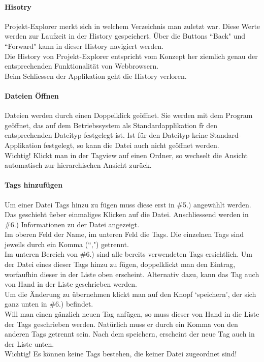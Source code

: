 \documentclass[10pt,paper=a4,final]{scrartcl}
\begin{document}
\paragraph{Hisotry}
Projekt-Explorer merkt sich in welchem Verzeichnis man zuletzt war. Diese Werte werden zur Laufzeit in der History gespeichert. \"Uber die Buttons “Back" und “Forward" kann in dieser History navigiert werden.\\
Die History von Projekt-Explorer entspricht vom Konzept her ziemlich genau der entsprechenden Funktionalit\"at von Webbrowsern.\\
Beim Schliessen der Applikation geht die History verloren.
\paragraph{Dateien \"Offnen}
Dateien werden durch einen Doppelklick ge\"offnet. Sie werden mit dem Program ge\"offnet, das auf dem Betriebssystem als Standardapplikation f\"r den entsprechenden Dateityp festgelegt ist. Ist f\"ur den Dateityp keine Standard-Applikation festgelegt, so kann die Datei auch nicht ge\"offnet werden.\\
Wichtig! Klickt man in der Tagview auf einen Ordner, so wechselt die Ansicht automatisch zur hierarchischen Ansicht zur\"uck.
\paragraph{Tags hinzuf\"ugen}
Um einer Datei Tags hinzu zu f\"ugen muss diese erst in \#5.) angew\"ahlt werden. Das geschieht \"ueber einmaliges Klicken auf die Datei. Anschliessend werden in \#6.) Informationen zu der Datei angezeigt.\\
Im oberen Feld der Name, im unteren Feld die Tags. Die einzelnen Tags sind jeweils durch ein Komma (“,") getrennt.\\
Im unteren Bereich von \#6.) sind alle bereits verwendeten Tags ersichtlich. Um der Datei eines dieser Tags hinzu zu f\"ugen, doppelklickt man den Eintrag, worfaufhin dieser in der Liste oben erscheint. Alternativ dazu, kann das Tag auch von Hand in der Liste geschrieben werden.\\
Um die \"Anderung zu \"ubernehmen klickt man auf den Knopf ‘speichern’, der sich ganz unten in \#6.) befindet.\\
Will man einen g\"anzlich neuen Tag anf\"ugen, so muss dieser von Hand in die Liste der Tags geschrieben werden. Nat\"urlich muss er durch ein Komma von den anderen Tags getrennt sein.
Nach dem speichern, erscheint der neue Tag auch in der Liste unten.\\
Wichtig! Es k\"onnen keine Tags bestehen, die keiner Datei zugeordnet sind!
\end{document}
